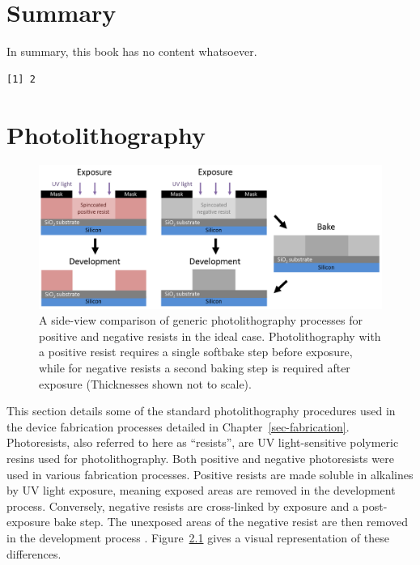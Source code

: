 \documentclass[
  a4paper,
]{scrbook}
\begin{document}

\hypertarget{summary}{%
\chapter{Summary}\label{summary}}

In summary, this book has no content whatsoever.

\begin{verbatim}
[1] 2
\end{verbatim}

\appendix
{}

\hypertarget{sec-photolithography}{%
\chapter{Photolithography}\label{sec-photolithography}}

\begin{figure}

{\centering \includegraphics{./figures/app1/positive-negative-photolithography.png}

}

\caption{\label{fig-photolithography-types}A side-view comparison of
generic photolithography processes for positive and negative resists in
the ideal case. Photolithography with a positive resist requires a
single softbake step before exposure, while for negative resists a
second baking step is required after exposure (Thicknesses shown not to
scale).}

\end{figure}

This section details some of the standard photolithography procedures
used in the device fabrication processes detailed in
Chapter~\ref{sec-fabrication}. Photoresists, also referred to here as
``resists'', are UV light-sensitive polymeric resins used for
photolithography. Both positive and negative photoresists were used in
various fabrication processes. Positive resists are made soluble in
alkalines by UV light exposure, meaning exposed areas are removed in the
development process. Conversely, negative resists are cross-linked by
exposure and a post-exposure bake step. The unexposed areas of the
negative resist are then removed in the development process
\autocite{Microchemicals}. Figure~\ref{fig-photolithography-types} gives
a visual representation of these differences.
\end{document}
